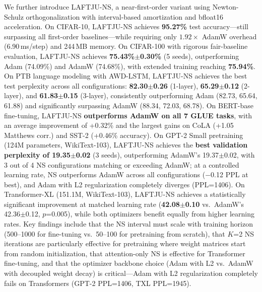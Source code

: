 \documentclass[10pt,twocolumn]{article}
\newcommand{\method}{LAFTJU}
\begin{document}
We further introduce \method{}-NS, a near-first-order variant using Newton-Schulz orthogonalization with interval-based amortization and bfloat16 acceleration. On CIFAR-10, \method{}-NS achieves \textbf{95.27\%} test accuracy---still surpassing all first-order baselines---while requiring only $1.92\times$ AdamW overhead (6.90\,ms/step) and 244\,MB memory. On CIFAR-100 with rigorous fair-baseline evaluation, \method{}-NS achieves \textbf{75.43\%$\pm$0.30\%} (5 seeds), outperforming Adam (74.09\%) and AdamW (74.68\%), with extended training reaching \textbf{75.94\%}. On PTB language modeling with AWD-LSTM, \method{}-NS achieves the best test perplexity across all configurations: \textbf{82.30$\pm$0.26} (1-layer), \textbf{65.29$\pm$0.12} (2-layer), and \textbf{61.83$\pm$0.15} (3-layer), consistently outperforming Adam (82.73, 65.64, 61.88) and significantly surpassing AdamW (88.34, 72.03, 68.78). On BERT-base fine-tuning, \method{}-NS \textbf{outperforms AdamW on all 7 GLUE tasks}, with an average improvement of +0.32\% and the largest gains on CoLA (+1.05 Matthews corr.) and SST-2 (+0.46\% accuracy). On GPT-2 Small pretraining (124M parameters, WikiText-103), \method{}-NS achieves the \textbf{best validation perplexity of 19.35$\pm$0.02} (3 seeds), outperforming AdamW's 19.37$\pm$0.02, with 3 out of 4 NS configurations matching or exceeding AdamW; at a controlled learning rate, NS outperforms AdamW across all configurations ($-$0.12 PPL at best), and Adam with L2 regularization completely diverges (PPL=1406). On Transformer-XL (151.1M, WikiText-103), \method{}-NS achieves a statistically significant improvement at matched learning rate (\textbf{42.08$\pm$0.10} vs.\ AdamW's 42.36$\pm$0.12, $p$=0.005), while both optimizers benefit equally from higher learning rates. Key findings include that the NS interval must scale with training horizon (500--1000 for fine-tuning vs.\ 50--100 for pretraining from scratch), that $K$=2 NS iterations are particularly effective for pretraining where weight matrices start from random initialization, that attention-only NS is effective for Transformer fine-tuning, and that the optimizer backbone choice (Adam with L2 vs.\ AdamW with decoupled weight decay) is critical---Adam with L2 regularization completely fails on Transformers (GPT-2 PPL=1406, TXL PPL=1945).
\end{document}
